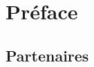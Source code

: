 \chapter*{Pr\'eface}


\vfill


\myclearpage


\myclearpage

\section*{Partenaires}


\myclearpage

